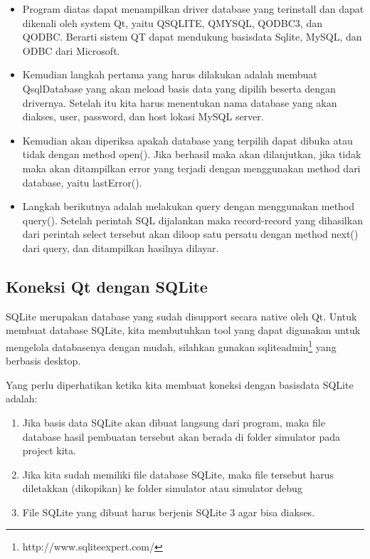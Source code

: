 \begin{itemize}

\item
  Program diatas dapat menampilkan driver database yang terinstall dan
  dapat dikenali oleh system Qt, yaitu QSQLITE, QMYSQL, QODBC3, dan
  QODBC. Berarti sistem QT dapat mendukung basisdata Sqlite, MySQL, dan
  ODBC dari Microsoft.
\item
  Kemudian langkah pertama yang harus dilakukan adalah membuat
  QsqlDatabase yang akan meload basis data yang dipilih beserta dengan
  drivernya. Setelah itu kita harus menentukan nama database yang akan
  diakses, user, password, dan host lokasi MySQL server.
\item
  Kemudian akan diperiksa apakah database yang terpilih dapat dibuka
  atau tidak dengan method open(). Jika berhasil maka akan dilanjutkan,
  jika tidak maka akan ditampilkan error yang terjadi dengan menggunakan
  method dari database, yaitu lastError().
\item
  Langkah berikutnya adalah melakukan query dengan menggunakan method
  query(). Setelah perintah SQL dijalankan maka record-record yang
  dihasilkan dari perintah select tersebut akan diloop satu persatu
  dengan method next() dari query, dan ditampilkan hasilnya dilayar.
\end{itemize}

\subsection{Koneksi Qt dengan SQLite}\label{koneksi-qt-dengan-sqlite}

SQLite merupakan database yang sudah disupport secara native oleh Qt.
Untuk membuat database SQLite, kita membutuhkan tool yang dapat
digunakan untuk mengelola databasenya dengan mudah, silahkan gunakan
sqliteadmin\footnote{http://www.sqliteexpert.com/} yang berbasis desktop.

Yang perlu diperhatikan ketika kita membuat koneksi dengan basisdata
SQLite adalah:

\begin{enumerate}


\item
  Jika basis data SQLite akan dibuat langsung dari program, maka file
  database hasil pembuatan tersebut akan berada di folder simulator pada
  project kita.
\item
  Jika kita sudah memiliki file database SQLite, maka file tersebut
  harus diletakkan (dikopikan) ke folder simulator atau simulator \textfractionsolidus debug
\item
  File SQLite yang dibuat harus berjenis SQLite 3 agar bisa diakses.
\end{enumerate}

